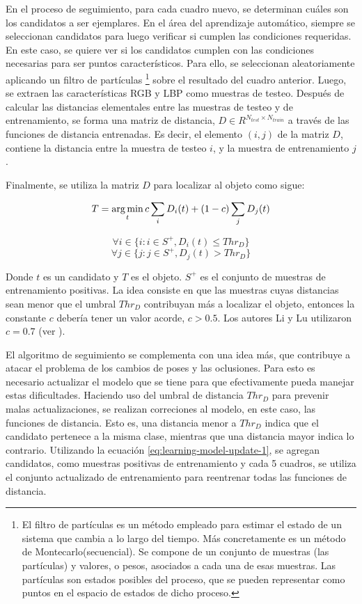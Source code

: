 En el proceso de seguimiento, para cada cuadro nuevo, se determinan cuáles son los candidatos
a ser ejemplares. En el área del aprendizaje automático, siempre se seleccionan
candidatos para luego verificar si cumplen las condiciones requeridas. En este
caso, se quiere ver si los candidatos cumplen con las condiciones necesarias
para ser puntos característicos. Para ello, se seleccionan
aleatoriamente aplicando un filtro de partículas
\footnote{El filtro de partículas es un método empleado para estimar el estado
  de un sistema que cambia a lo largo del tiempo. Más concretamente es un
  método de Montecarlo(secuencial). Se compone de un conjunto de muestras (las
  partículas) y valores, o pesos, asociados a cada una de esas muestras.
  Las partículas son estados posibles del proceso, que se pueden representar
  como puntos en el espacio de estados de dicho proceso.}
sobre el resultado del cuadro anterior. Luego, se extraen las características
RGB y LBP como muestras de testeo. Después de calcular las distancias
elementales entre las muestras de testeo y de entrenamiento, se forma una
matriz de distancia, $D \in R^{N_{test} \times N_{train}}$ a través de las
funciones de distancia entrenadas. Es decir, el elemento $(i,j)$ de la matriz
$D$, contiene la distancia entre la muestra de testeo $i$, y la muestra de
entrenamiento $j$.

Finalmente, se utiliza la matriz $D$ para localizar al objeto como sigue:

\begin{equation}
    T = \operatorname*{arg\,min}_{t} c \sum_{i} D_{i}(t) + (1 - c) \sum_{j} D_{j}(t)
\end{equation}

\begin{equation}
    \forall i \in \{i : i \in S^{+}, D_{i}(t) \leq Thr_{D} \}
\end{equation}
\begin{equation}
    \forall j \in \{j : j \in S^{+}, D_{j}(t) > Thr_{D} \}
\end{equation}

Donde $t$ es un candidato y $T$ es el objeto. $S^{+}$ es el
conjunto de muestras de entrenamiento positivas. La idea consiste en
que las muestras cuyas distancias sean menor que el umbral $Thr_{D}$
contribuyan más a localizar el objeto, entonces la constante $c$ debería tener
un valor acorde, $c > 0.5$. Los autores Li y Lu utilizaron $c = 0.7$ (ver
\cite{local-learning}).

El algoritmo de seguimiento se complementa con una idea más, que
contribuye a atacar el problema de los cambios de poses y las oclusiones.
Para esto es necesario actualizar el modelo que se tiene para
que efectivamente pueda manejar estas dificultades.
Haciendo uso del umbral de distancia $Thr_{D}$ para prevenir
malas actualizaciones, se realizan correciones al modelo,
en este caso, las funciones de distancia. Esto es, una distancia
menor a $Thr_{D}$ indica que el candidato pertenece a la misma clase,
mientras que una distancia mayor indica lo contrario. Utilizando
la ecuación \ref{eq:learning-model-update-1}, se agregan candidatos,
como muestras positivas de entrenamiento y cada 5 cuadros,
se utiliza el conjunto actualizado de entrenamiento para
reentrenar todas las funciones de distancia.

